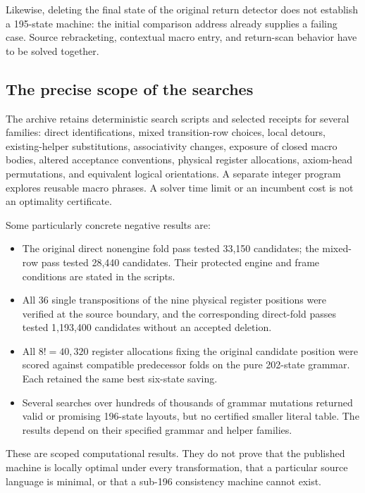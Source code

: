 \documentclass[11pt,letterpaper]{article}
\begin{document}
Likewise, deleting the final state of the original return detector does not
establish a 195-state machine: the initial comparison address already
supplies a failing case. Source rebracketing, contextual macro entry, and
return-scan behavior have to be solved together.

\subsection{The precise scope of the searches}
The archive retains deterministic search scripts and selected receipts for
several families: direct identifications, mixed transition-row choices,
local detours, existing-helper substitutions, associativity changes,
exposure of closed macro bodies, altered acceptance conventions, physical
register allocations, axiom-head permutations, and equivalent logical
orientations. A separate integer program explores reusable macro phrases.
A solver time limit or an incumbent cost is not an optimality certificate.

Some particularly concrete negative results are:
\begin{itemize}
\item The original direct nonengine fold pass tested 33,150 candidates; the
mixed-row pass tested 28,440 candidates. Their protected engine and frame
conditions are stated in the scripts.
\item All 36 single transpositions of the nine physical register positions
were verified at the source boundary, and the corresponding direct-fold
passes tested 1,193,400 candidates without an accepted deletion.
\item All $8!=40,320$ register allocations fixing the original candidate
position were scored against compatible predecessor folds on the pure
202-state grammar. Each retained the same best six-state saving.
\item Several searches over hundreds of thousands of grammar mutations
returned valid or promising 196-state layouts, but no certified smaller
literal table. The results depend on their specified grammar and helper
families.
\end{itemize}
These are scoped computational results. They do not prove that the published
machine is locally optimal under every transformation, that a particular
source language is minimal, or that a sub-196 consistency machine cannot
exist.
\end{document}
